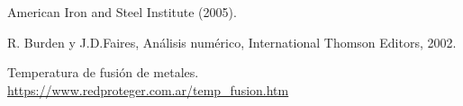 \documentclass[12pt]{article}
\begin{document}
\pagebreak
\listoffigures

\begin{thebibliography}{9}
American Iron and Steel Institute (2005). %

R. Burden y J.D.Faires, Análisis numérico, International Thomson Editors, 2002.

Temperatura de fusión de metales. \url{https://www.redproteger.com.ar/temp_fusion.htm}

\end{thebibliography}
\end{document}
